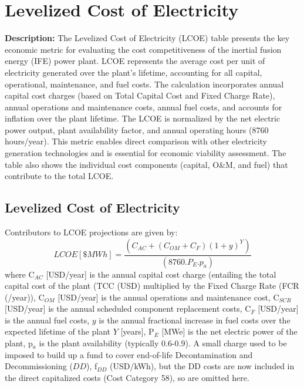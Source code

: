 \newpage 

\section{Levelized Cost of Electricity}

\textbf{Description:} The Levelized Cost of Electricity (LCOE) table presents the key economic metric for evaluating the cost competitiveness of the inertial fusion energy (IFE) power plant. LCOE represents the average cost per unit of electricity generated over the plant's lifetime, accounting for all capital, operational, maintenance, and fuel costs. The calculation incorporates annual capital cost charges (based on Total Capital Cost and Fixed Charge Rate), annual operations and maintenance costs, annual fuel costs, and accounts for inflation over the plant lifetime. The LCOE is normalized by the net electric power output, plant availability factor, and annual operating hours (8760 hours/year). This metric enables direct comparison with other electricity generation technologies and is essential for economic viability assessment. The table also shows the individual cost components (capital, O\&M, and fuel) that contribute to the total LCOE.

\subsection{Levelized Cost of Electricity}

 Contributors to LCOE projections are given by: 
 \begin{equation} 
 LCOE [\$ MWh] = \frac{(C_{AC} + (C_{OM} + C_{F})(1+y)^Y)}{(8760.P_E.p_a)} 
 \label{eq:coe}
\end{equation} 
where C$_{AC}$ [USD/year] is the annual capital cost charge (entailing the total capital cost of the plant (TCC (USD) multiplied by the Fixed Charge Rate (FCR (/year)), C$_{OM}$ [USD/year] is the annual operations and maintenance cost, C$_{SCR}$ [USD/year] is the annual scheduled component replacement costs, C$_{F}$ [USD/year] is the annual fuel costs, $y$ is the annual fractional increase in fuel costs over the expected lifetime of the plant $Y$ [years], P$_{E}$ [MWe] is the net electric power of the plant, p$_{a}$ is the plant availability (typically 0.6-0.9).  A small charge used to be imposed to build up a fund to cover end-of-life Decontamination and Decommissioning ($DD$), f$_{DD}$ (USD/kWh), but the DD costs are now included in the direct capitalized costs (Cost Category 58), so are omitted here.

